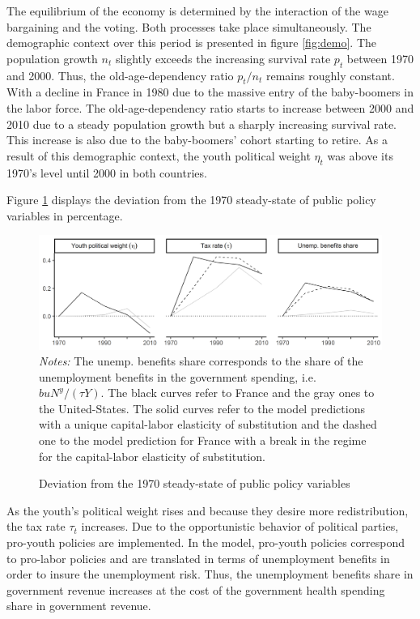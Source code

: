 The equilibrium of the economy is determined by the interaction of the wage bargaining and the voting. Both processes take place simultaneously. The demographic context over this period is presented in figure \ref{fig:demo}. The population growth $n_t$ slightly exceeds the increasing survival rate $p_t$ between 1970 and 2000. Thus, the old-age-dependency ratio $p_t/n_t$ remains roughly constant. With a decline in France in 1980 due to the massive entry of the baby-boomers in the labor force. The old-age-dependency ratio starts to increase between 2000 and 2010 due to a steady population growth but a sharply increasing survival rate. This increase is also due to the baby-boomers' cohort starting to retire. As a result of this demographic context, the youth political weight $\eta_t$ was above its 1970's level until 2000 in both countries.

Figure \ref{fig:dev_public7010} displays the deviation from the 1970 steady-state of public policy variables in percentage.
\begin{figure}[tb]
	\centering
	\caption{Deviation from the 1970 steady-state of public policy variables} \label{fig:dev_public7010}
	\includegraphics[width=1\linewidth]{../result/deviation/dev_public7010.png}
	\vspace{-6ex}
 	\justify\singlespacing\footnotesize \textit{Notes:} The unemp. benefits share corresponds to the share of the unemployment benefits in the government spending, i.e. $buN^y/(\tau Y)$. The black curves refer to France and the gray ones to the United-States. The solid curves refer to the model predictions with a unique capital-labor elasticity of substitution and the dashed one to the model prediction for France with a break in the regime for the capital-labor elasticity of substitution.
\end{figure}
As the youth's political weight rises and because they desire more redistribution, the tax rate $\tau_t$ increases. Due to the opportunistic behavior of political parties, pro-youth policies are implemented. In the model, pro-youth policies correspond to pro-labor policies and are translated in terms of unemployment benefits in order to insure the unemployment risk. Thus, the unemployment benefits share in government revenue increases at the cost of the government health spending share in government revenue.


